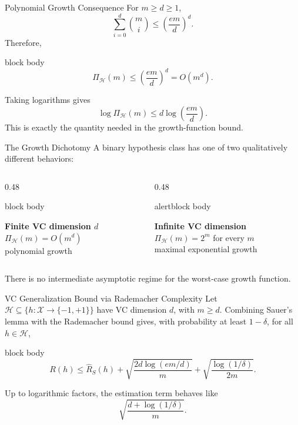 \documentclass[aspectratio=169,10pt]{beamer}
\newcommand{\X}{\mathcal{X}}
\newcommand{\Hc}{\mathcal{H}}
\newcommand{\Rhat}{\widehat{R}_S}
\newcommand{\PiH}{\Pi_{\Hc}}
\newcommand{\pmone}{\{-1,+1\}}
\newcommand{\KeyBox}[1]{%
  \begin{beamercolorbox}[rounded=true,sep=0.22cm,wd=\linewidth]{block body}
    #1
  \end{beamercolorbox}%
}
\newcommand{\OrangeBox}[1]{%
  \begin{beamercolorbox}[rounded=true,sep=0.22cm,wd=\linewidth]{alertblock body}
    #1
  \end{beamercolorbox}%
}
\begin{document}
\begin{frame}[t]{Polynomial Growth Consequence}
  \vspace{0.02cm}
  For $m\ge d\ge1$,
  \[
    \sum_{i=0}^{d}\binom{m}{i}
    \le \left(\frac{em}{d}\right)^d.
  \]
  Therefore,
  \begin{beamercolorbox}[rounded=true,sep=0.20cm,wd=\linewidth]{block body}
    \[
      \boxed{
      \PiH(m)\le\left(\frac{em}{d}\right)^d=O(m^d).}
    \]
  \end{beamercolorbox}
  \vspace{0.14cm}
  Taking logarithms gives
  \[
    \log\PiH(m)\le d\log\!\left(\frac{em}{d}\right).
  \]
  This is exactly the quantity needed in the growth-function bound.
\end{frame}

\begin{frame}[t]{The Growth Dichotomy}
  \vspace{0.04cm}
  A binary hypothesis class has one of two qualitatively different behaviors:
  \vspace{0.08cm}
  \begin{columns}[T,totalwidth=\textwidth]
    \begin{column}{0.48\textwidth}
      \KeyBox{
      \centering
      \textbf{Finite VC dimension $d$}\\[0.10cm]
      $\PiH(m)=O(m^d)$\\
      polynomial growth}
    \end{column}
    \begin{column}{0.48\textwidth}
      \OrangeBox{
      \centering
      \textbf{Infinite VC dimension}\\[0.10cm]
      $\PiH(m)=2^m$ for every $m$\\
      maximal exponential growth}
    \end{column}
  \end{columns}
  \vspace{0.18cm}
  \centering
  There is no intermediate asymptotic regime for the worst-case growth function.
\end{frame}

\begin{frame}[t]{VC Generalization Bound via Rademacher Complexity}
  \vspace{0.02cm}
  Let $\Hc\subseteq\{h:\X\to\pmone\}$ have VC dimension $d$, with $m\ge d$. Combining Sauer's lemma with the Rademacher bound gives, with probability at least $1-\delta$, for all $h\in\Hc$,
  \begin{beamercolorbox}[rounded=true,sep=0.18cm,wd=\linewidth]{block body}
    \[
      \boxed{
      R(h)\le\Rhat(h)
      +\sqrt{\frac{2d\log(em/d)}{m}}
      +\sqrt{\frac{\log(1/\delta)}{2m}}.}
    \]
  \end{beamercolorbox}
  \vspace{0.10cm}
  Up to logarithmic factors, the estimation term behaves like
  \[
    \sqrt{\frac{d+\log(1/\delta)}{m}}.
  \]
\end{frame}
\end{document}
